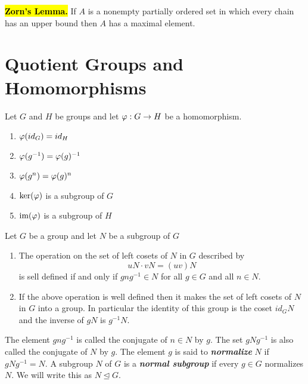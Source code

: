 \nl

\hl{\textbf{Zorn's Lemma.}} If $A$ is a nonempty partially ordered set in which every chain has an upper bound then $A$ has a maximal element.


\section{Quotient Groups and Homomorphisms}

\setcounter{thm}{0}
\begin{prop}
Let $G$ and $H$ be groups and let $\varphi: G\rightarrow H$ be a homomorphism.
\begin{enumerate}
\item $\varphi(id_G) = id_H$
\item $\varphi(g^{-1}) = \varphi(g)^{-1}$
\item $\varphi(g^n)= \varphi(g)^n$
\item $\ker(\varphi)$ is a subgroup of $G$
\item $\text{im}(\varphi)$ is a subgroup of $H$
\end{enumerate}
\end{prop}

\nl
\begin{prop}\label{coset_op}
Let $G$ be a group and let $N$ be a subgroup of $G$
\begin{enumerate}
\item The operation on the set of left cosets of $N$ in $G$ described by
\[uN\cdot vN = (uv)N\]
is sell defined if and only if $gng^{-1}\in N$ for all $g\in G$ and all $n\in N$.
\item If the above operation is well defined then it makes the set of left cosets of $N$ in $G$ into a group. In particular the identity of this group is the coset $id_G N$and the inverse of $gN$ is $g^{-1}N$.
\end{enumerate}
\end{prop}

\nl


\begin{defn}
The element $gng^{-1}$ is called the conjugate of $n\in N$ by $g$. The set $gNg^{-1}$ is also called the conjugate of $N$ by $g$. The element $g$ is said to \textbf{\textit{normalize}} $N$ if $gNg^{-1} = N$. A subgroup $N$ of $G$ is a \textbf{\textit{normal subgroup}} if every $g\in G$ normalizes $N$. We will write this as $N \unlhd G$.
\end{defn}


